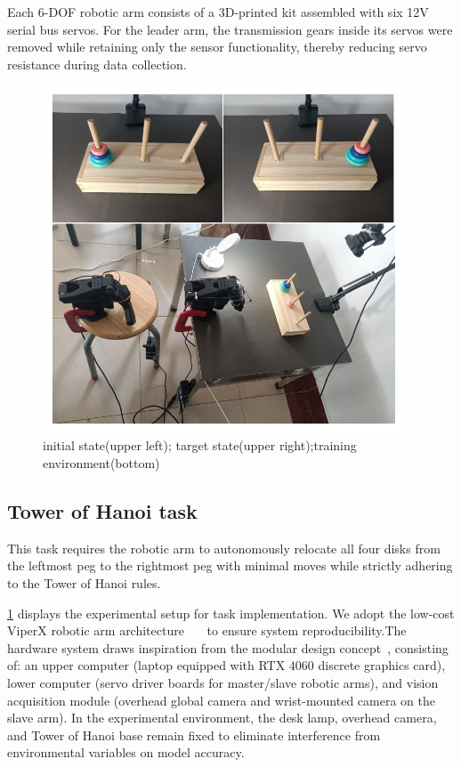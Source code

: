 \documentclass[runningheads]{llncs}
\begin{document}
Each 6-DOF robotic arm consists of a 3D-printed kit assembled with six 12V serial bus servos. For the leader arm, the transmission gears inside its servos were removed while retaining only the sensor functionality, thereby reducing servo resistance during data collection.


\begin{figure}
\centering
  \includegraphics[width=0.95\textwidth]{fig4.pdf}
  \caption{ initial state(upper left); target state(upper right);training environment(bottom)} \label{fig2}
  \end{figure}

\subsection{Tower of Hanoi task}

This task requires the robotic arm to autonomously relocate all four disks from the leftmost peg to the rightmost peg with minimal moves while strictly adhering to the Tower of Hanoi rules.

\cref{fig2} displays the experimental setup for task implementation. We adopt the low-cost ViperX robotic arm architecture~\cite{ref1}~\cite{ref2}~\cite{ref3} to ensure system reproducibility.The hardware system draws inspiration from the modular design concept~\cite{ref4}, consisting of: an upper computer (laptop equipped with RTX 4060 discrete graphics card), lower computer (servo driver boards for master/slave robotic arms), and vision acquisition module (overhead global camera and wrist-mounted camera on the slave arm). In the experimental environment, the desk lamp, overhead camera, and Tower of Hanoi base remain fixed to eliminate interference from environmental variables on model accuracy.
\end{document}
